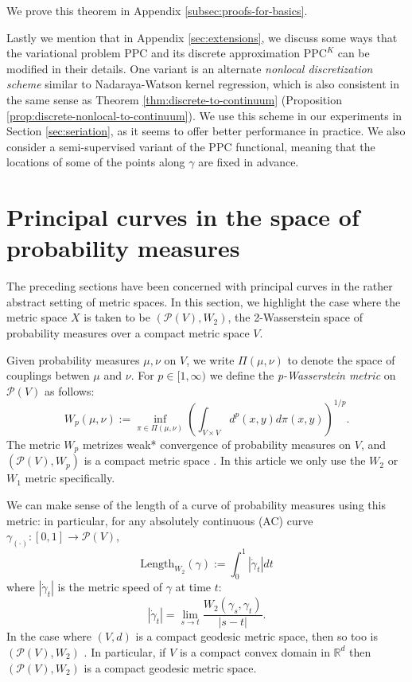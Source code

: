 \documentclass[aos, preprint]{imsart}
\theoremstyle{plain}
\theoremstyle{remark}
\begin{document}
{We prove this theorem in Appendix \ref{subsec:proofs-for-basics}.

Lastly we mention that in Appendix \ref{sec:extensions}, we discuss some ways that the variational problem $\text{PPC}$ and its discrete approximation $\text{PPC}^K$ can be modified in their details. One variant is an alternate \emph{nonlocal discretization scheme} similar to Nadaraya-Watson kernel regression, which is also consistent in the same sense as Theorem \ref{thm:discrete-to-continuum} (Proposition \ref{prop:discrete-nonlocal-to-continuum}). We use this scheme in our experiments in Section \ref{sec:seriation}, as it seems to offer better performance in practice. We also consider a semi-supervised variant of the $\text{PPC}$ functional, meaning that the locations of some of the points along $\gamma$ are fixed in advance.


\section{Principal curves in the space of probability measures}
\label{sec:Wasserstein}

The preceding sections have been concerned with principal curves
in the rather abstract setting of metric spaces. In this section,
we highlight the case where the metric space $X$ is taken to be $(\mathcal{P}(V),W_{2})$,
the 2-Wasserstein space of probability measures over a compact metric
space $V$.

Given probability measures $\mu,\nu$ on $V$, we write $\Pi(\mu,\nu)$ to denote the space of couplings betwen $\mu$ and $\nu$. For $p\in[1,\infty)$  we define  the \emph{p-Wasserstein metric}
on $\mathcal{P}(V)$ as follows:
\[
 W_{p}(\mu,\nu) := \inf_{\pi\in\Pi(\mu,\nu)}
\left(\int_{V\times V} d^p(x,y)d\pi(x,y)\right)^{1/p}.
\]
The metric $W_p$ metrizes weak* convergence of probability measures on $V$, and $(\mathcal{P}(V),W_{p})$ is a compact metric space \cite{ambrosio2013user}. In this article we only use the $W_2$ or $W_1$ metric specifically.

We can make sense of the length of a curve of probability measures using this metric: in particular,
for any absolutely continuous (AC) curve $\gamma_{(\cdot)} : [0,1]
\rightarrow \mathcal{P}(V)$,
\[
\text{Length}_{W_{2}}(\gamma):=\int_{0}^{1}|\dot{\gamma}_{t}|dt
\]
where $|\dot{\gamma}_{t}|$ is the metric speed of $\gamma$ at time
$t$:
\[
  |\dot{\gamma}_{t}| = \lim_{s\rightarrow t} \frac{W_{2}(\gamma_{s},
    \gamma_{t})}{|s-t|}.
\]
In the case where $(V,d)$ is a compact geodesic metric space, then so too is $(\mathcal{P}(V),W_2)$ \cite[Theorem 2.10]{ambrosio2013user}. In particular, if
$V$ is a compact convex domain in $\mathbb{R}^{d}$ then
$(\mathcal{P}(V),W_{2})$ is a compact geodesic metric space.

}
\end{document}
